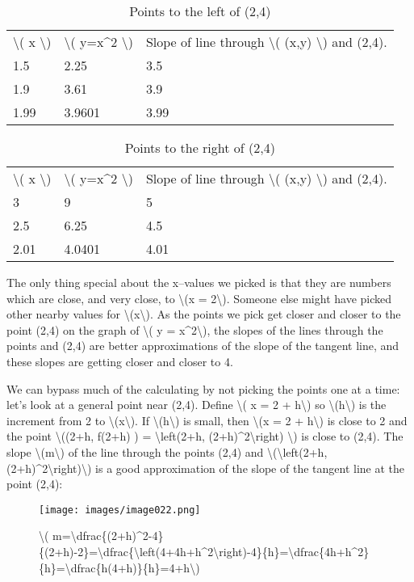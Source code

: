 \begin{longtable}[]{@{}lll@{}}
\caption{Points to the left of (2,4)}\tabularnewline
\toprule
\endhead
\textbackslash{}( x \textbackslash{}) & \textbackslash{}( y=x\^{}2
\textbackslash{}) & Slope of line through \textbackslash{}( (x,y)
\textbackslash{}) and (2,4).\tabularnewline
1.5 & 2.25 & 3.5\tabularnewline
1.9 & 3.61 & 3.9\tabularnewline
1.99 & 3.9601 & 3.99\tabularnewline
\bottomrule
\end{longtable}

\begin{longtable}[]{@{}lll@{}}
\caption{Points to the right of (2,4)}\tabularnewline
\toprule
\endhead
\textbackslash{}( x \textbackslash{}) & \textbackslash{}( y=x\^{}2
\textbackslash{}) & Slope of line through \textbackslash{}( (x,y)
\textbackslash{}) and (2,4).\tabularnewline
3 & 9 & 5\tabularnewline
2.5 & 6.25 & 4.5\tabularnewline
2.01 & 4.0401 & 4.01\tabularnewline
\bottomrule
\end{longtable}

The only thing special about the x--values we picked is that they are
numbers which are close, and very close, to \textbackslash{}(x =
2\textbackslash{}). Someone else might have picked other nearby values
for \textbackslash{}(x\textbackslash{}). As the points we pick get
closer and closer to the point (2,4) on the graph of \textbackslash{}( y
= x\^{}2\textbackslash{}), the slopes of the lines through the points
and (2,4) are better approximations of the slope of the tangent line,
and these slopes are getting closer and closer to 4.

We can bypass much of the calculating by not picking the points one at a
time: let's look at a general point near (2,4). Define \textbackslash{}(
x = 2 + h\textbackslash{}) so \textbackslash{}(h\textbackslash{}) is the
increment from 2 to \textbackslash{}(x\textbackslash{}). If
\textbackslash{}(h\textbackslash{}) is small, then \textbackslash{}(x =
2 + h\textbackslash{}) is close to 2 and the point
\textbackslash{}((2+h, f(2+h) ) = \textbackslash{}left(2+h,
(2+h)\^{}2\textbackslash{}right) \textbackslash{}) is close to (2,4).
The slope \textbackslash{}(m\textbackslash{}) of the line through the
points (2,4) and \textbackslash{}(\textbackslash{}left(2+h,
(2+h)\^{}2\textbackslash{}right)\textbackslash{}) is a good
approximation of the slope of the tangent line at the point (2,4):

\begin{figure}
\centering
\texttt{[image: images/image022.png]}
\caption{\textbackslash{}(
m=\textbackslash{}dfrac\{(2+h)\^{}2-4\}\{(2+h)-2\}=\textbackslash{}dfrac\{\textbackslash{}left(4+4h+h\^{}2\textbackslash{}right)-4\}\{h\}=\textbackslash{}dfrac\{4h+h\^{}2\}\{h\}=\textbackslash{}dfrac\{h(4+h)\}\{h\}=4+h\textbackslash{})}
\end{figure}

